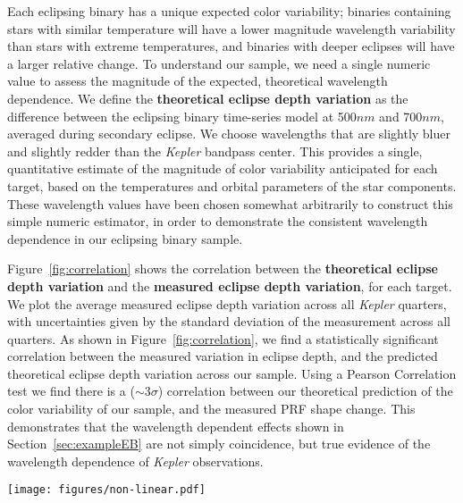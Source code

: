 \documentclass[iop]{emulateapj}
\newcommand{\kepler}{\emph{Kepler}\xspace}
\newcommand{\target}{KIC 2708156\xspace}
\begin{document}
Each eclipsing binary has a unique expected color variability; binaries containing stars with similar temperature will have a lower magnitude wavelength variability than stars with extreme temperatures, and binaries with deeper eclipses will have a larger relative change. To understand our sample, we need a single numeric value to assess the magnitude of the expected, theoretical wavelength dependence. We define the \textbf{theoretical eclipse depth variation} as the difference between the eclipsing binary time-series model at 500$nm$ and 700$nm$, averaged during secondary eclipse. We choose wavelengths that are slightly bluer and slightly redder than the \kepler bandpass center. This provides a single, quantitative estimate of the magnitude of color variability anticipated for each target, based on the temperatures and orbital parameters of the star components. These wavelength values have been chosen somewhat arbitrarily to construct this simple numeric estimator, in order to demonstrate the consistent wavelength dependence in our eclipsing binary sample.

Figure~\ref{fig:correlation} shows the correlation between the \textbf{theoretical eclipse depth variation} and the \textbf{measured eclipse depth variation}, for each target. We plot the average measured eclipse depth variation across all \kepler quarters, with uncertainties given by the standard deviation of the measurement across all quarters. As shown in Figure~\ref{fig:correlation}, we find a statistically significant correlation between the measured variation in eclipse depth, and the predicted theoretical eclipse depth variation across our sample. Using a Pearson Correlation test we find there is a ($\sim 3\sigma$) correlation between our theoretical prediction of the color variability of our sample, and the measured PRF shape change. This demonstrates that the wavelength dependent effects shown in Section~\ref{sec:exampleEB} are not simply coincidence, but true evidence of the wavelength dependence of \kepler observations.


\begin{figure*}
    \centering
    \texttt{[image: figures/non-linear.pdf]}
    \caption{\emph{Left:} The SAP flux for \target as a function of time. \emph{Right:} The SAP flux for \target as a function of reduced chi squared. The primary eclipses have been highlighted in red, and the secondary eclipses have been highlighted in blue. The primary and secondary eclipses clearly follow two tracks in reduced chi squared, with the secondary eclipse having generally higher reduced chi squared as a function of flux. Given that there are several instances where the flux from primary eclipse and secondary eclipse is measured to be the same (normalized flux $\approx 0.85-1$), we understand the pixel-level model fit to be "worse" during secondary eclipse. As such, the PRF shape change we identify in this work can not be attributed to simple systematic effects due to non-linearity of flux, including the brighter-fatter effect, which would be agnostic of the "phase" of the binary.}
    \label{fig:non-linear}
\end{figure*}
\end{document}
